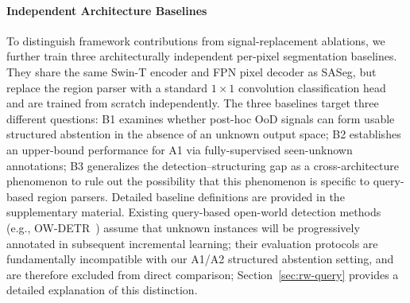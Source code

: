 \documentclass[journal]{IEEEtai}
\begin{document}
\paragraph{Independent Architecture Baselines}
To distinguish framework contributions from signal-replacement ablations, we further
train three architecturally independent per-pixel segmentation baselines.
They share the same Swin-T encoder and FPN pixel decoder as SASeg, but replace the
region parser with a standard $1 \times 1$ convolution classification head and are
trained from scratch independently.
The three baselines target three different questions: B1 examines whether post-hoc OoD
signals can form usable structured abstention in the absence of an unknown output space;
B2 establishes an upper-bound performance for A1 via fully-supervised seen-unknown
annotations; B3 generalizes the detection--structuring gap as a cross-architecture
phenomenon to rule out the possibility that this phenomenon is specific to query-based
region parsers.
Detailed baseline definitions are provided in the supplementary material.
Existing query-based open-world detection methods (e.g., OW-DETR~\cite{gupta2021owdetr})
assume that unknown instances will be progressively annotated in subsequent incremental
learning; their evaluation protocols are fundamentally incompatible with our A1/A2
structured abstention setting, and are therefore excluded from direct comparison;
Section~\ref{sec:rw-query} provides a detailed explanation of this distinction.
\end{document}
